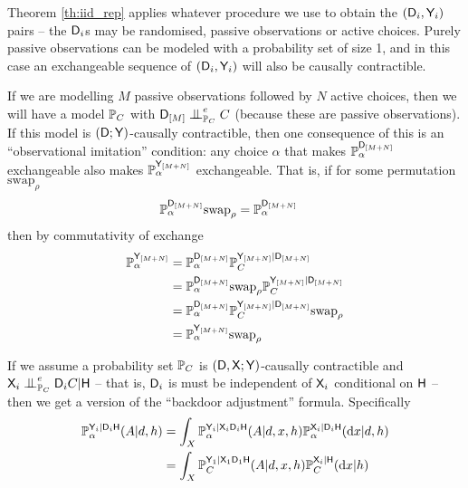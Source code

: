 Theorem \ref{th:iid_rep} applies whatever procedure we use to obtain the $(\mathsf{D}_i,\mathsf{Y}_i)$ pairs -- the $\mathsf{D}_i$s may be randomised, passive observations or active choices. Purely passive observations can be modeled with a probability set of size 1, and in this case an exchangeable sequence of $(\mathsf{D}_i,\mathsf{Y}_i)$ will also be causally contractible.

If we are modelling $M$ passive observations followed by $N$ active choices, then we will have a model $\mathbb{P}_C$ with $\RV{D}_{[M]}\CI_{\prob{P}_C}^e C$ (because these are passive observations). If this model is $(\mathsf{D};\mathsf{Y})$-causally contractible, then one consequence of this is an ``observational imitation'' condition: any choice $\alpha$ that makes $\mathbb{P}_\alpha^{\mathsf{D}_{[M+N]}}$ exchangeable also makes $\mathbb{P}_\alpha^{\mathsf{Y}_{[M+N]}}$ exchangeable. That is, if for some permutation $\mathrm{swap}_\rho$
\begin{align}
    \mathbb{P}_\alpha^{\mathsf{D}_{[M+N]}}\mathrm{swap}_\rho &= \mathbb{P}_\alpha^{\mathsf{D}_{[M+N]}}
\end{align}
then by commutativity of exchange
\begin{align}
    \mathbb{P}_\alpha^{\mathsf{Y}_{[M+N]}} &= \mathbb{P}_\alpha^{\mathsf{D}_{[M+N]}} \mathbb{P}_C^{\mathsf{Y}_{[M+N]}|\mathsf{D}_{[M+N]}}\\
    &=  \mathbb{P}_\alpha^{\mathsf{D}_{[M+N]}}\mathrm{swap}_\rho \mathbb{P}_C^{\mathsf{Y}_{[M+N]}|\mathsf{D}_{[M+N]}}\\
    &= \mathbb{P}_\alpha^{\mathsf{D}_{[M+N]}} \mathbb{P}_C^{\mathsf{Y}_{[M+N]}|\mathsf{D}_{[M+N]}}\mathrm{swap}_\rho\\
    &= \mathbb{P}_\alpha^{\mathsf{Y}_{[M+N]}}\mathrm{swap}_\rho
\end{align}

If we assume a probability set $\mathbb{P}_C$ is $(\mathsf{D},\mathsf{X};\mathsf{Y})$-causally contractible and $\RV{X}_{i}\CI^e_{\prob{P}_C}\RV{D}_{i}C|\RV{H}$ -- that is, $\mathsf{D}_i$ is must be independent of $\mathsf{X}_i$ conditional on $\mathsf{H}$ -- then we get a version of the ``backdoor adjustment'' formula. Specifically
\begin{align}
    \mathbb{P}_\alpha^{\mathsf{Y}_{i}|\mathsf{D}_{i}\mathsf{H}}(A|d,h) &= \int_X \mathbb{P}_\alpha^{\mathsf{Y}_{i}|\mathsf{X}_{i}\mathsf{D}_{i}\mathsf{H}}(A|d,x,h)\mathbb{P}_\alpha^{\mathsf{X}_{i}|\mathsf{D}_{i}\mathsf{H}}(\mathrm{d}x|d,h)\\
    &= \int_X \mathbb{P}_C^{\mathsf{Y}_{1}|\mathsf{X}_{1}\mathsf{D}_{1}\mathsf{H}}(A|d,x,h)\mathbb{P}_C^{\mathsf{X}_{i}|\mathsf{H}}(\mathrm{d}x|h)
\end{align}

